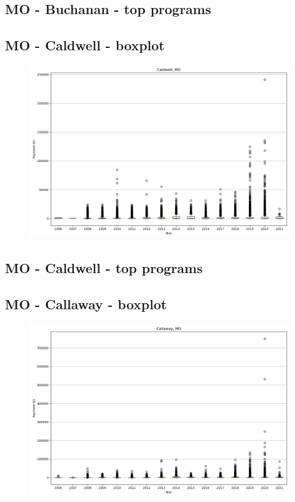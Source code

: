 \subsection*{MO - Buchanan - top programs}

\newpage
\subsection*{MO - Caldwell - boxplot}
\begin{figure}[h]
\centering
\includegraphics[width=7in]{../output/boxplots/counties/Caldwell-MO_boxplot.png}
\end{figure}


\subsection*{MO - Caldwell - top programs}

\newpage
\subsection*{MO - Callaway - boxplot}
\begin{figure}[h]
\centering
\includegraphics[width=7in]{../output/boxplots/counties/Callaway-MO_boxplot.png}
\end{figure}



